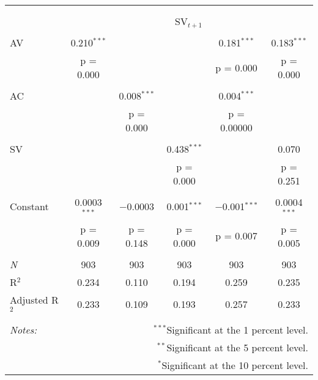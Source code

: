 
\begin{tabular}{@{\extracolsep{5pt}}lccccc} 
\\[-1.8ex]\hline 
\hline \\[-1.8ex] 
\\[-1.8ex] & \multicolumn{5}{c}{SV$_{t+1}$} \\ 
\hline \\[-1.8ex] 
 AV & 0.210$^{***}$ &  &  & 0.181$^{***}$ & 0.183$^{***}$ \\ 
  & p = 0.000 &  &  & p = 0.000 & p = 0.000 \\ 
  & & & & & \\ 
 AC &  & 0.008$^{***}$ &  & 0.004$^{***}$ &  \\ 
  &  & p = 0.000 &  & p = 0.00000 &  \\ 
  & & & & & \\ 
 SV &  &  & 0.438$^{***}$ &  & 0.070 \\ 
  &  &  & p = 0.000 &  & p = 0.251 \\ 
  & & & & & \\ 
 Constant & 0.0003$^{***}$ & $-$0.0003 & 0.001$^{***}$ & $-$0.001$^{***}$ & 0.0004$^{***}$ \\ 
  & p = 0.009 & p = 0.148 & p = 0.000 & p = 0.007 & p = 0.005 \\ 
  & & & & & \\ 
\textit{N} & 903 & 903 & 903 & 903 & 903 \\ 
R$^{2}$ & 0.234 & 0.110 & 0.194 & 0.259 & 0.235 \\ 
Adjusted R$^{2}$ & 0.233 & 0.109 & 0.193 & 0.257 & 0.233 \\ 
\hline 
\hline \\[-1.8ex] 
\textit{Notes:} & \multicolumn{5}{r}{$^{***}$Significant at the 1 percent level.} \\ 
 & \multicolumn{5}{r}{$^{**}$Significant at the 5 percent level.} \\ 
 & \multicolumn{5}{r}{$^{*}$Significant at the 10 percent level.} \\ 
\end{tabular} 
